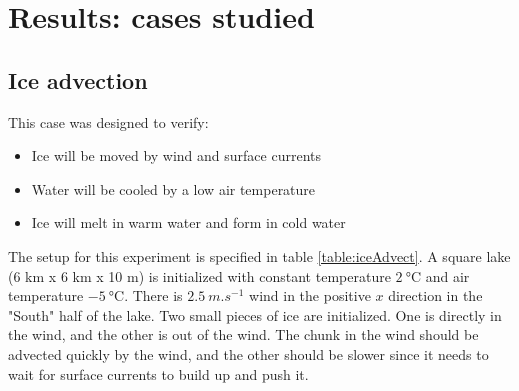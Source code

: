 \documentclass[11pt]{article}
\begin{document}
\section{Results: cases studied}

\subsection{Ice advection}
This case was designed to verify:
\begin{itemize}
\item{Ice will be moved by wind and surface currents}
\item{Water will be cooled by a low air temperature}
\item{Ice will melt in warm water and form in cold water}
\end{itemize}
The setup for this experiment is specified in table \ref{table:iceAdvect}. A square lake (6 km x 6 km x 10 m) is initialized with constant temperature $\SI{2}{\celsius}$ and air temperature $\SI{-5}{\celsius}$. There is $\SI{2.5}{m.s^{-1}}$ wind in the positive $x$ direction in the "South" half of the lake. Two small pieces of ice are initialized. One is directly in the wind, and the other is out of the wind. The chunk in the wind should be advected quickly by the wind, and the other should be slower since it needs to wait for surface currents to build up and push it.
\end{document}
